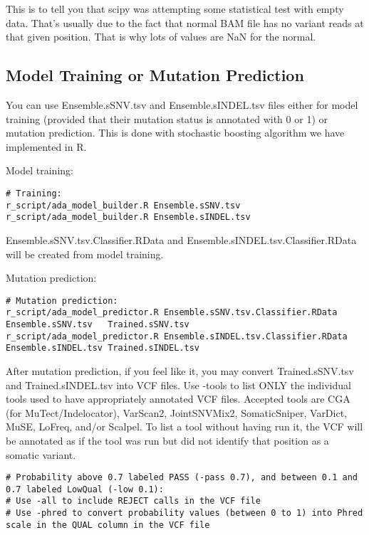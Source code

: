 \documentclass[10pt,letterpaper]{article}
\begin{document}
\begin{sloppypar}
This is to tell you that scipy was attempting some statistical test with empty data. That's usually due to the fact that normal BAM file has no variant reads at that given position. That is why lots of values are NaN for the normal. 




\subsection{Model Training or Mutation Prediction}

You can use Ensemble.sSNV.tsv and Ensemble.sINDEL.tsv files either for model training (provided that their mutation status is annotated with 0 or 1) or mutation prediction. This is done with stochastic boosting algorithm we have implemented in R. 
	
Model training:
\begin{lstlisting}
# Training:
r_script/ada_model_builder.R Ensemble.sSNV.tsv
r_script/ada_model_builder.R Ensemble.sINDEL.tsv
\end{lstlisting}
	
Ensemble.sSNV.tsv.Classifier.RData and Ensemble.sINDEL.tsv.Classifier.RData will be created from model training.
	

Mutation prediction:
	
\begin{lstlisting}
# Mutation prediction:
r_script/ada_model_predictor.R Ensemble.sSNV.tsv.Classifier.RData   Ensemble.sSNV.tsv   Trained.sSNV.tsv
r_script/ada_model_predictor.R Ensemble.sINDEL.tsv.Classifier.RData Ensemble.sINDEL.tsv Trained.sINDEL.tsv
\end{lstlisting}

	
After mutation prediction, if you feel like it, you may convert Trained.sSNV.tsv and Trained.sINDEL.tsv into VCF files. Use -tools to list ONLY the individual tools used to have appropriately annotated VCF files. Accepted tools are CGA (for MuTect/Indelocator), VarScan2, JointSNVMix2, SomaticSniper, VarDict, MuSE, LoFreq, and/or Scalpel. To list a tool without having run it, the VCF will be annotated as if the tool was run but did not identify that position as a somatic variant. 


\begin{lstlisting}
# Probability above 0.7 labeled PASS (-pass 0.7), and between 0.1 and 0.7 labeled LowQual (-low 0.1):
# Use -all to include REJECT calls in the VCF file
# Use -phred to convert probability values (between 0 to 1) into Phred scale in the QUAL column in the VCF file


\end{lstlisting}
\end{sloppypar}
\end{document}
